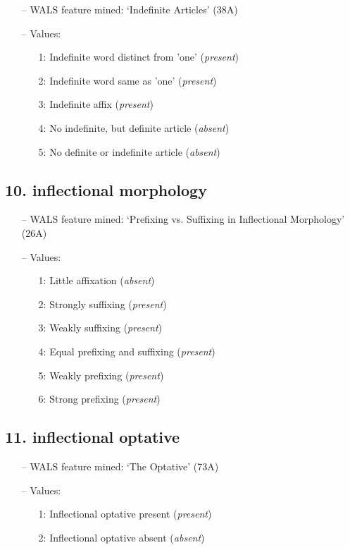 \begin{itemize}
\item[--] WALS feature mined: `Indefinite Articles' (38A)
\item[--] Values:

\begin{enumerate}
\item[1:] Indefinite word distinct from 'one' (\emph{present})
\item[2:] Indefinite word same as 'one' (\emph{present})
\item[3:] Indefinite affix (\emph{present})
\item[4:] No indefinite, but definite article (\emph{absent})
\item[5:] No definite or indefinite article (\emph{absent})
\end{enumerate}
\end{itemize}

\subsection*{10. inflectional morphology}

\begin{itemize}
\item[--] WALS feature mined: `Prefixing vs. Suffixing in Inflectional Morphology' (26A)
\item[--] Values:

\begin{enumerate}
\item[1:] Little affixation (\emph{absent})
\item[2:] Strongly suffixing (\emph{present})
\item[3:] Weakly suffixing (\emph{present})
\item[4:] Equal prefixing and suffixing (\emph{present})
\item[5:] Weakly prefixing (\emph{present})
\item[6:] Strong prefixing (\emph{present})
\end{enumerate}
\end{itemize}

\subsection*{11. inflectional optative}

\begin{itemize}
\item[--] WALS feature mined: `The Optative' (73A)
\item[--] Values:

\begin{enumerate}
\item[1:] Inflectional optative present (\emph{present})
\item[2:] Inflectional optative absent (\emph{absent})
\end{enumerate}
\end{itemize}

